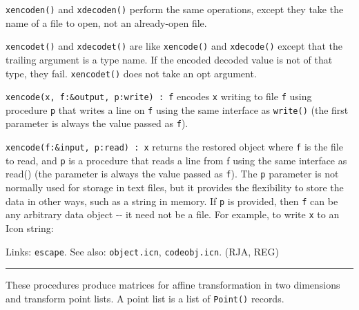 \texttt{xencoden()} and \texttt{xdecoden()} perform the same operations,
except they take the name of a file to open, not an already-open file.

\texttt{xencodet()} and \texttt{xdecodet()} are like \texttt{xencode()}
and \texttt{xdecode()} except that the trailing argument is a type
name. If the encoded decoded value is not of that type, they fail.
\texttt{xencodet()} does not take an opt argument. 

\texttt{xencode(x, f:\&output, p:write) : f} encodes \texttt{x} writing
to file \texttt{f} using procedure \texttt{p} that writes a line on
\texttt{f} using the same interface as \texttt{write()} (the first
parameter is always the value passed as \texttt{f}).

\texttt{xencode(f:\&input, p:read) : x} returns the restored object
where \texttt{f} is the file to read, and \texttt{p} is a procedure
that reads a line from f using the same interface as read() (the
parameter is always the value passed as \texttt{f}). The \texttt{p}
parameter is not normally used for storage in text files, but it
provides the flexibility to store the data in other ways, such as a
string in memory. If \texttt{p} is provided, then \texttt{f} can be any
arbitrary data object -{}- it need not be a file. For example, to
{\textquotedbl}write{\textquotedbl} \texttt{x} to an Icon string:


Links: \texttt{escape}. See also: \texttt{object.icn},
\texttt{codeobj.icn}. (RJA, REG)

\vspace{0.25cm}\hrule{}

These procedures produce matrices for affine transformation in two
dimensions and transform point lists. A point list is a list of
\texttt{Point()} records.


